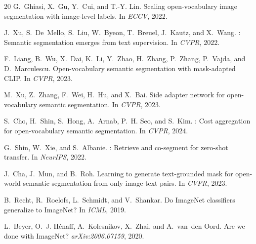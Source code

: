 \documentclass[11pt]{article}
\begin{document}
\begin{thebibliography}{20}
G.~Ghiasi, X.~Gu, Y.~Cui, and T.-Y. Lin.
\newblock Scaling open-vocabulary image segmentation with image-level labels.
\newblock In \emph{ECCV}, 2022.

J.~Xu, S.~De~Mello, S.~Liu, W.~Byeon, T.~Breuel, J.~Kautz, and X.~Wang.
: Semantic segmentation emerges from text supervision.
\newblock In \emph{CVPR}, 2022.

F.~Liang, B.~Wu, X.~Dai, K.~Li, Y.~Zhao, H.~Zhang, P.~Zhang, P.~Vajda, and
  D.~Marculescu.
\newblock Open-vocabulary semantic segmentation with mask-adapted {CLIP}.
\newblock In \emph{CVPR}, 2023.

M.~Xu, Z.~Zhang, F.~Wei, H.~Hu, and X.~Bai.
\newblock Side adapter network for open-vocabulary semantic segmentation.
\newblock In \emph{CVPR}, 2023.

S.~Cho, H.~Shin, S.~Hong, A.~Arnab, P.~H. Seo, and S.~Kim.
: Cost aggregation for open-vocabulary semantic
  segmentation.
\newblock In \emph{CVPR}, 2024.

G.~Shin, W.~Xie, and S.~Albanie.
: Retrieve and co-segment for zero-shot transfer.
\newblock In \emph{NeurIPS}, 2022.

J.~Cha, J.~Mun, and B.~Roh.
\newblock Learning to generate text-grounded mask for open-world semantic
  segmentation from only image-text pairs.
\newblock In \emph{CVPR}, 2023.

B.~Recht, R.~Roelofs, L.~Schmidt, and V.~Shankar.
\newblock Do {ImageNet} classifiers generalize to {ImageNet}?
\newblock In \emph{ICML}, 2019.

L.~Beyer, O.~J. H\'enaff, A.~Kolesnikov, X.~Zhai, and A.~van~den Oord.
\newblock Are we done with {ImageNet}?
\newblock \emph{arXiv:2006.07159}, 2020.

\end{thebibliography}
\end{document}
